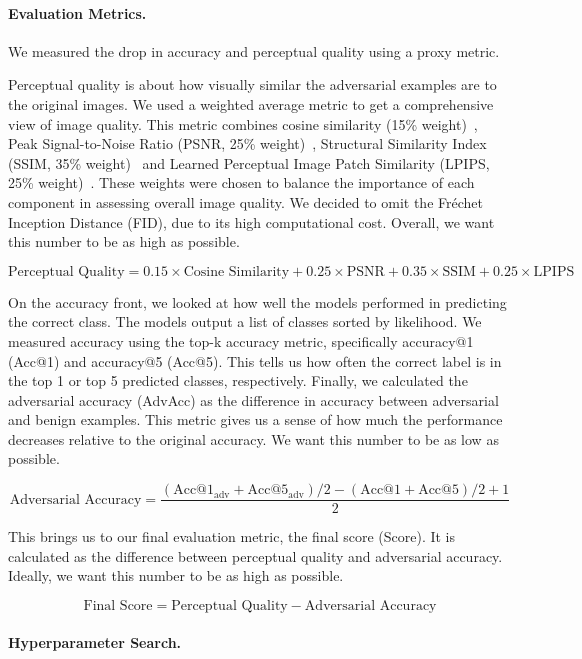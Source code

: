 \documentclass[a4paper, oneside]{discothesis}
\begin{document}
\paragraph{Evaluation Metrics.}

We measured the drop in accuracy and perceptual quality using a proxy metric.

Perceptual quality is about how visually similar the adversarial examples are to the original images. We used a weighted average metric to get a comprehensive view of image quality. This metric combines cosine similarity (15\% weight)~\cite{singhal2001modern}, Peak Signal-to-Noise Ratio (PSNR, 25\% weight)~\cite{9311108}, Structural Similarity Index (SSIM, 35\% weight)~\cite{wang2004image} and Learned Perceptual Image Patch Similarity (LPIPS, 25\% weight)~\cite{lpips}. These weights were chosen to balance the importance of each component in assessing overall image quality. We decided to omit the Fréchet Inception Distance (FID), due to its high computational cost. Overall, we want this number to be as high as possible.

$$
\text{Perceptual Quality} = 0.15 \times \text{Cosine Similarity} + 0.25 \times \text{PSNR} + 0.35 \times \text{SSIM} + 0.25 \times \text{LPIPS}
$$

On the accuracy front, we looked at how well the models performed in predicting the correct class. The models output a list of classes sorted by likelihood. We measured accuracy using the top-k accuracy metric, specifically accuracy@1 (Acc@1) and accuracy@5 (Acc@5). This tells us how often the correct label is in the top 1 or top 5 predicted classes, respectively. Finally, we calculated the adversarial accuracy (AdvAcc) as the difference in accuracy between adversarial and benign examples. This metric gives us a sense of how much the performance decreases relative to the original accuracy. We want this number to be as low as possible.

$$
\text{Adversarial Accuracy} = \frac{(\text{Acc@1}_{\text{adv}} + \text{Acc@5}_{\text{adv}}) / 2 - (\text{Acc@1} + \text{Acc@5}) / 2 + 1}{2}
$$

This brings us to our final evaluation metric, the final score (Score). It is calculated as the difference between perceptual quality and adversarial accuracy. Ideally, we want this number to be as high as possible.

$$
\text{Final Score} = \text{Perceptual Quality} - \text{Adversarial Accuracy}
$$

\paragraph{Hyperparameter Search.}
\end{document}
